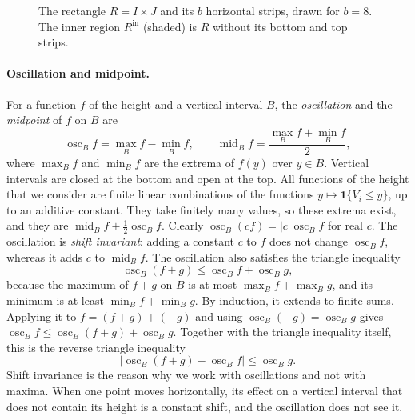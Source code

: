 \documentclass[11pt,letterpaper]{article}
\newcommand{\1}{\mathbf{1}}
\newcommand{\osc}{\operatorname{osc}}
\newcommand{\midp}{\operatorname{mid}}
\newcommand{\Rin}{R^{\mathrm{in}}}
\begin{document}
\begin{figure}[!htb]
\centering
{}
\caption{The rectangle $R=I\times J$ and its $b$ horizontal strips, drawn for $b=8$. The inner region $\Rin$ (shaded) is $R$ without its bottom and top strips.}
\label{fig:local}
\end{figure}

\paragraph{Oscillation and midpoint.}
For a function $f$ of the height and a vertical interval $B$, the \emph{oscillation} and the \emph{midpoint} of $f$ on $B$ are
\begin{equation}\label{eq:osc}
\osc_Bf=\max_Bf-\min_Bf,\qquad\midp_Bf=\frac{\max_Bf+\min_Bf}2,
\end{equation}
where $\max_Bf$ and $\min_Bf$ are the extrema of $f(y)$ over $y\in B$. Vertical intervals are closed at the bottom and open at the top. All functions of the height that we consider are finite linear combinations of the functions $y\mapsto\1\{V_i\le y\}$, up to an additive constant. They take finitely many values, so these extrema exist, and they are \mbox{$\midp_Bf\pm\frac12\osc_Bf$}. Clearly $\osc_B(cf)=|c|\osc_Bf$ for real $c$. The oscillation is \emph{shift invariant}: adding a constant $c$ to $f$ does not change $\osc_Bf$, whereas it adds $c$ to $\midp_Bf$. The oscillation also satisfies the triangle inequality
\[
\osc_B(f+g)\le\osc_Bf+\osc_Bg,
\]
because the maximum of $f+g$ on $B$ is at most $\max_Bf+\max_Bg$, and its minimum is at least $\min_Bf+\min_Bg$. By induction, it extends to finite sums. Applying it to $f=(f+g)+(-g)$ and using $\osc_B(-g)=\osc_Bg$ gives $\osc_Bf\le\osc_B(f+g)+\osc_Bg$. Together with the triangle inequality itself, this is the reverse triangle inequality
\[
|\osc_B(f+g)-\osc_Bf|\le\osc_Bg.
\]
Shift invariance is the reason why we work with oscillations and not with maxima. When one point moves horizontally, its effect on a vertical interval that does not contain its height is a constant shift, and the oscillation does not see it.
\end{document}
